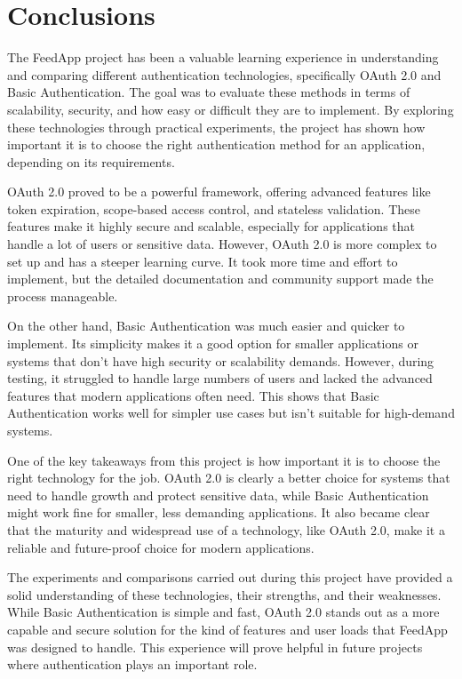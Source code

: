 \section{Conclusions}

The FeedApp project has been a valuable learning experience in understanding and comparing different authentication technologies, specifically OAuth 2.0 and Basic Authentication. The goal was to evaluate these methods in terms of scalability, security, and how easy or difficult they are to implement. By exploring these technologies through practical experiments, the project has shown how important it is to choose the right authentication method for an application, depending on its requirements.

OAuth 2.0 proved to be a powerful framework, offering advanced features like token expiration, scope-based access control, and stateless validation. These features make it highly secure and scalable, especially for applications that handle a lot of users or sensitive data. However, OAuth 2.0 is more complex to set up and has a steeper learning curve. It took more time and effort to implement, but the detailed documentation and community support made the process manageable.

On the other hand, Basic Authentication was much easier and quicker to implement. Its simplicity makes it a good option for smaller applications or systems that don’t have high security or scalability demands. However, during testing, it struggled to handle large numbers of users and lacked the advanced features that modern applications often need. This shows that Basic Authentication works well for simpler use cases but isn’t suitable for high-demand systems.

One of the key takeaways from this project is how important it is to choose the right technology for the job. OAuth 2.0 is clearly a better choice for systems that need to handle growth and protect sensitive data, while Basic Authentication might work fine for smaller, less demanding applications. It also became clear that the maturity and widespread use of a technology, like OAuth 2.0, make it a reliable and future-proof choice for modern applications.

The experiments and comparisons carried out during this project have provided a solid understanding of these technologies, their strengths, and their weaknesses. While Basic Authentication is simple and fast, OAuth 2.0 stands out as a more capable and secure solution for the kind of features and user loads that FeedApp was designed to handle. This experience will prove helpful in future projects where authentication plays an important role.